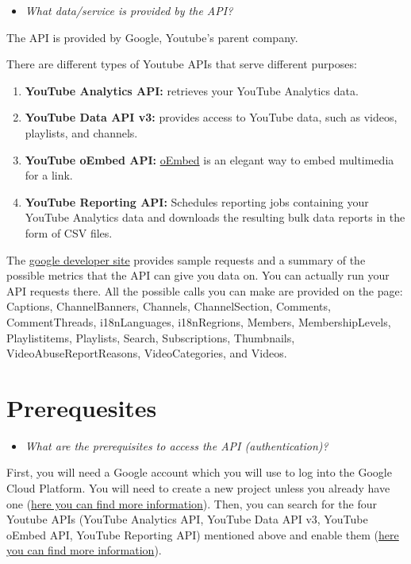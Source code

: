\documentclass[
]{book}
\providecommand{\tightlist}{%
  \setlength{\itemsep}{0pt}\setlength{\parskip}{0pt}}
\begin{document}
\begin{itemize}
\tightlist
\item
  \emph{What data/service is provided by the API?}
\end{itemize}

The API is provided by Google, Youtube's parent company.

There are different types of Youtube APIs that serve different purposes:

\begin{enumerate}
\def\labelenumi{\arabic{enumi}.}
\tightlist
\item
  \textbf{YouTube Analytics API:} retrieves your YouTube Analytics data.
\item
  \textbf{YouTube Data API v3:} provides access to YouTube data, such as videos, playlists, and channels.
\item
  \textbf{YouTube oEmbed API:} \href{https://oembed.com/}{oEmbed} is an elegant way to embed multimedia for a link.
\item
  \textbf{YouTube Reporting API:} Schedules reporting jobs containing your YouTube Analytics data and downloads the resulting bulk data reports in the form of CSV files.
\end{enumerate}

The \href{https://developers.google.com/youtube/v3/sample_requests}{google developer site} provides sample requests and a summary of the possible metrics that the API can give you data on. You can actually run your API requests there. All the possible calls you can make are provided on the page: Captions, ChannelBanners, Channels, ChannelSection, Comments, CommentThreads, i18nLanguages, i18nRegrions, Members, MembershipLevels, Playlistitems, Playlists, Search, Subscriptions, Thumbnails, VideoAbuseReportReasons, VideoCategories, and Videos.

\hypertarget{prerequesites-8}{%
\section{Prerequesites}\label{prerequesites-8}}

\begin{itemize}
\tightlist
\item
  \emph{What are the prerequisites to access the API (authentication)? }
\end{itemize}

First, you will need a Google account which you will use to log into the Google Cloud Platform. You will need to create a new project unless you already have one (\href{https://cloud.google.com/resource-manager/docs/creating-managing-projects}{here you can find more information}). Then, you can search for the four Youtube APIs (YouTube Analytics API, YouTube Data API v3, YouTube oEmbed API, YouTube Reporting API) mentioned above and enable them (\href{https://support.google.com/googleapi/answer/6158841?hl=en}{here you can find more information}).
\end{document}
